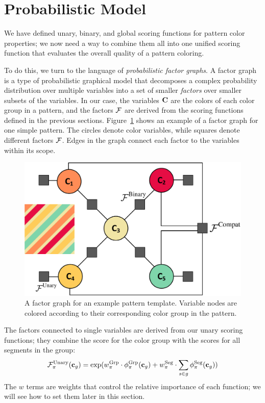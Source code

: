 \section{Probabilistic Model}
\label{sec:model}

We have defined unary, binary, and global scoring functions for pattern color properties; we now need a way to combine them all into one unified scoring function that evaluates the overall quality of a pattern coloring.

To do this, we turn to the language of \emph{probabilistic factor graphs}. A factor graph is a type of probabilistic graphical model that decomposes a complex probability distribution over multiple variables into a set of smaller \emph{factors} over smaller subsets of the variables. In our case, the variables $\mathbf{C}$ are the colors of each color group in a pattern, and the factors $\mathcal{F}$ are derived from the scoring functions defined in the previous sections. Figure~\ref{fig:FactorGraph} shows an example of a factor graph for one simple pattern. The circles denote color variables, while squares denote different factors $\mathcal{F}$. Edges in the graph connect each factor to the variables within its scope.

\begin{figure}[ht]
\includegraphics[width=\columnwidth]{figs/factorGraphNew}
\caption{A factor graph for an example pattern template. Variable nodes are colored according to their corresponding color group in the pattern.}
\label{fig:FactorGraph}
\end{figure}

The factors connected to single variables are derived from our unary scoring functions; they combine the score for the color group with the scores for all segments in the group:
\begin{equation*}
 \mathcal{F}^{\textrm{Unary}}_\pi(\mathbf{c}_g) =
 		\exp( w^{\textrm{Grp}}_\pi \cdot \phi^{\textrm{Grp}}_\pi(\mathbf{c}_g)  \\
 		     + w^{\textrm{Seg}}_\pi \cdot \sum_{s \in g} \phi^{\textrm{Seg}}_\pi(\mathbf{c}_g)) 
\end{equation*}
The $w$ terms are weights that control the relative importance of each function; we will see how to set them later in this section.

